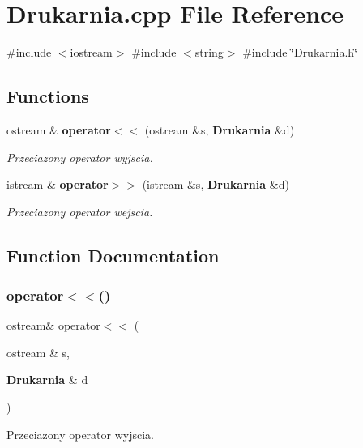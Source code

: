\section{Drukarnia.\+cpp File Reference}
\label{_drukarnia_8cpp}
{\ttfamily \#include $<$iostream$>$}\newline
{\ttfamily \#include $<$string$>$}\newline
{\ttfamily \#include \char`\"{}Drukarnia.\+h\char`\"{}}\newline
\subsection*{Functions}
\begin{DoxyCompactItemize}
\item 
ostream \& \textbf{ operator$<$$<$} (ostream \&s, \textbf{ Drukarnia} \&d)
\begin{DoxyCompactList}\small\item\em Przeciazony operator wyjscia. \end{DoxyCompactList}\item 
istream \& \textbf{ operator$>$$>$} (istream \&s, \textbf{ Drukarnia} \&d)
\begin{DoxyCompactList}\small\item\em Przeciazony operator wejscia. \end{DoxyCompactList}\end{DoxyCompactItemize}


\subsection{Function Documentation}
\mbox{\label{_drukarnia_8cpp_a0980f69a891e6b38b5bba72efa182ef9}} 
\subsubsection{operator$<$$<$()}
{\footnotesize\ttfamily ostream\& operator$<$$<$ (\begin{DoxyParamCaption}\item[{ostream \&}]{s,  }\item[{\textbf{ Drukarnia} \&}]{d }\end{DoxyParamCaption})}



Przeciazony operator wyjscia. 

